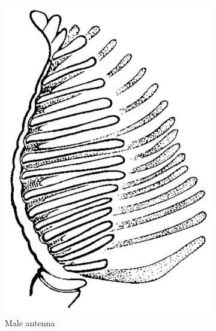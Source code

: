 \documentclass[letterpaper, 11pt]{article}
\begin{document}
\begin{figure}[ht!]
    \centering
    \begin{subfigure}[ht!]{0.14\textwidth}
        \includegraphics[width=\textwidth]{DiprionidAntenna}
        \caption{Male antenna}
        \label{fig:diprionid1}
    \end{subfigure}
    \qquad
    \begin{subfigure}[ht!]{0.45\textwidth}

\end{subfigure}
\end{figure}
\end{document}
